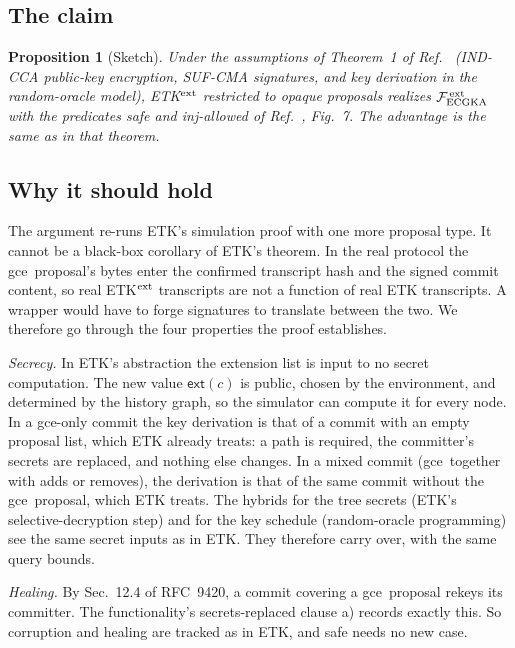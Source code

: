 \documentclass[aps,prx,reprint,superscriptaddress,nofootinbib,floatfix]{revtex4-2}
\newtheorem{proposition}{Proposition}
\theoremstyle{remark}
\newcommand{\gce}{\textsf{gce}}
\newcommand{\ext}{\mathsf{ext}}
\newcommand{\Fx}{\mathcal F^{\,\rm ext}_{\rm ECGKA}}
\begin{document}
\subsection{The claim}

\begin{proposition}[Sketch]\label{prop:ext}
Under the assumptions of Theorem~1 of Ref.~\cite{etk} (IND-CCA public-key encryption, SUF-CMA signatures, and key derivation in the random-oracle model), ETK$^{\rm ext}$ restricted to opaque proposals realizes $\Fx$ with the predicates \textsf{safe} and \textsf{inj-allowed} of Ref.~\cite{etk}, Fig.~7. The advantage is the same as in that theorem.
\end{proposition}

\subsection{Why it should hold}

The argument re-runs ETK's simulation proof with one more proposal type. It cannot be a black-box corollary of ETK's theorem. In the real protocol the \gce\ proposal's bytes enter the confirmed transcript hash and the signed commit content, so real ETK$^{\rm ext}$ transcripts are not a function of real ETK transcripts. A wrapper would have to forge signatures to translate between the two. We therefore go through the four properties the proof establishes.

\emph{Secrecy.} In ETK's abstraction the extension list is input to no secret computation. The new value $\ext(c)$ is public, chosen by the environment, and determined by the history graph, so the simulator can compute it for every node. In a \gce-only commit the key derivation is that of a commit with an empty proposal list, which ETK already treats: a path is required, the committer's secrets are replaced, and nothing else changes. In a mixed commit (\gce\ together with adds or removes), the derivation is that of the same commit without the \gce\ proposal, which ETK treats. The hybrids for the tree secrets (ETK's selective-decryption step) and for the key schedule (random-oracle programming) see the same secret inputs as in ETK. They therefore carry over, with the same query bounds.

\emph{Healing.} By Sec.~12.4 of RFC~9420, a commit covering a \gce\ proposal rekeys its committer. The functionality's \textsf{secrets-replaced} clause a) records exactly this. So corruption and healing are tracked as in ETK, and \textsf{safe} needs no new case.
\end{document}
